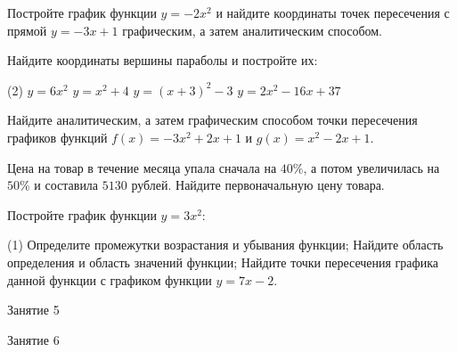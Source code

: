 \begin{class}[number=4]
	\begin{listofex}
		\item Постройте график функции \( y=-2x^2 \) и найдите координаты точек пересечения с прямой \( y=-3x+1 \) графическим, а затем аналитическим способом.
		\item Найдите координаты вершины параболы и постройте их:
		\begin{tasks}(2)
			\task \( y=6x^2 \)
			\task \( y=x^2+4 \)
			\task \( y=(x+3)^2-3 \)
			\task \( y=2x^2-16x+37 \)
		\end{tasks}
		\item Найдите аналитическим, а затем графическим способом точки пересечения графиков функций \(f(x)=-3x^2+2x+1\)	и \( g(x)=x^2-2x+1 \).
		\item Цена на товар в течение месяца упала сначала на \( 40\% \), а потом увеличилась на \( 50\% \) и составила \( 5130  \) рублей. Найдите первоначальную цену товара.
	\end{listofex}
\end{class}

\begin{homework}[number=2]
	\begin{listofex}
		\item Постройте график функции \( y=3x^2 \):
		\begin{tasks}(1)
			\task Определите промежутки возрастания и убывания функции;
			\task Найдите область определения и область значений функции;
			\task Найдите точки пересечения графика данной функции с графиком функции \( y=7x-2 \).
		\end{tasks}
		\item \exercise{1422}
	\end{listofex}
\end{homework}

\begin{class}[number=5]
	\begin{listofex}
		\item Занятие 5
	\end{listofex}
\end{class}

\begin{class}[number=6]
	\begin{listofex}
		\item Занятие 6
	\end{listofex}
\end{class}

